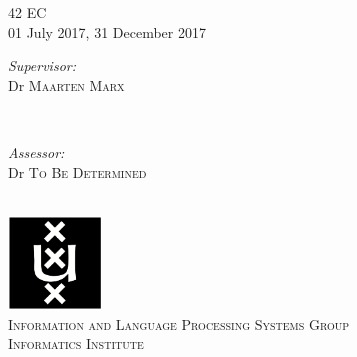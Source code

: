 \begin{titlepage}
42 EC\\ %
01 July 2017, 31 December 2017 \\[1cm]%

\begin{minipage}[t]{0.4\textwidth}
\begin{flushleft} \large
\emph{Supervisor:} \\
Dr \textsc{Maarten Marx} %
\end{flushleft}
\end{minipage}
~
\begin{minipage}[t]{0.4\textwidth}
\begin{flushright} \large
\emph{Assessor:} \\
Dr \textsc{To Be Determined}\\
\end{flushright}
\end{minipage}\\[2cm]


\includegraphics[width=2.5cm]{figures/logo-uva}\\ %
\textsc{\large Information and Language Processing Systems Group\\ Informatics Institute}\\[1.0cm] %
 

\vfill %

\end{titlepage}
\restoregeometry